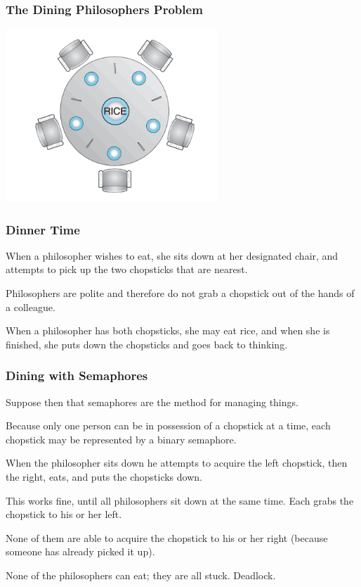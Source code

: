 \begin{frame}
\frametitle{The Dining Philosophers Problem}

\begin{center}
\includegraphics[width=0.6\textwidth]{images/philosopher-table.png}
\end{center}

\end{frame}

\begin{frame}
\frametitle{Dinner Time}

When a philosopher wishes to eat, she sits down at her designated chair, and attempts to pick up the two chopsticks that are nearest. 

Philosophers are polite and therefore do not grab a chopstick out of the hands of a colleague.

 When a philosopher has both chopsticks, she may eat rice, and when she is finished, she puts down the chopsticks and goes back to thinking.


\end{frame}

\begin{frame}
\frametitle{Dining with Semaphores}

 Suppose then that semaphores are the method for managing things. 
 
 Because only one person can be in possession of a chopstick at a time, each chopstick may be represented by a binary semaphore. 
 
When the philosopher sits down he attempts to acquire the left chopstick, then the right, eats, and puts the chopsticks down. 
 
This works fine, until all philosophers sit down at the same time. Each grabs the chopstick to his or her left.

 None of them are able to acquire the chopstick to his or her right (because someone has already picked it up). 
 
 None of the philosophers can eat; they are all stuck. Deadlock.

\end{frame}

